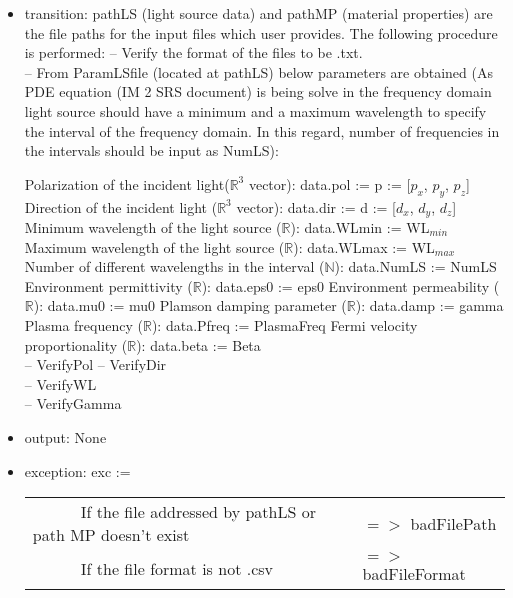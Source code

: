 \documentclass[12pt, titlepage]{article}
\begin{document}
	\begin{itemize} \item transition: pathLS (light source data) and pathMP
		(material properties) are the file paths for the input files which user
		provides. The following procedure is performed: \subitem -- Verify the format
		of the files to be .txt.\\ \subitem -- From ParamLSfile (located at pathLS)
		below parameters are obtained (As PDE equation (IM 2 SRS document) is being
		solve in the frequency domain light source should have a minimum and a maximum
		wavelength to specify the interval of the frequency domain. In this regard,
		number of frequencies in the intervals should be input as NumLS):
		
		\subsubitem Polarization of the incident light($\mathbb{R}^3$ vector):
		data.pol := p := [$p_x$, $p_y$, $p_z$] \subsubitem Direction of the incident
		light ($\mathbb{R}^3$ vector): data.dir := d := [$d_x$, $d_y$, $d_z$]
		\subsubitem Minimum wavelength of the light source ($\mathbb{R}$): data.WLmin
		:= WL$_{min}$ \subsubitem Maximum wavelength of the light source
		($\mathbb{R}$): data.WLmax := WL$_{max}$ \subsubitem Number of different
		wavelengths in the interval ($\mathbb{N}$): data.NumLS := NumLS \subsubitem
		Environment permittivity ($\mathbb{R}$): data.eps0 := eps0 \subsubitem
		Environment permeability ($\mathbb{R}$): data.mu0 := mu0 \subsubitem Plamson
		damping parameter ($\mathbb{R}$): data.damp := gamma \subsubitem Plasma
		frequency ($\mathbb{R}$): data.Pfreq := PlasmaFreq \subsubitem Fermi velocity
		proportionality ($\mathbb{R}$): data.beta := Beta\\ \subitem -- VerifyPol
		\subitem -- VerifyDir\\ \subitem -- VerifyWL\\ \subitem -- VerifyGamma\\
		
		\item output: None
		
		\item exception: exc :=\  \noindent \begin{longtable*}[l]{l l} \ \ \ \ \ \ If
			the file addressed by pathLS or path MP doesn't exist & $=>$ badFilePath\\ \ \
			\ \ \ \ If the file format is not .csv & $=>$ badFileFormat\\ \end{longtable*}
		
	\end{itemize}
	
\end{document}
